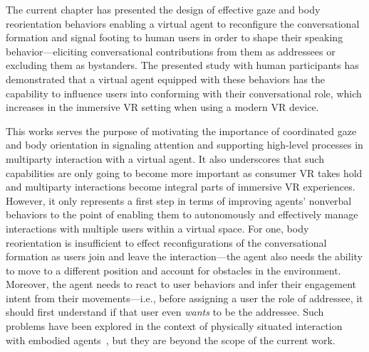The current chapter has presented the design of effective gaze and body reorientation behaviors enabling a virtual agent to reconfigure the conversational formation and signal footing to human users in order to shape their speaking behavior---eliciting conversational contributions from them as addressees or excluding them as bystanders. The presented study with human participants has demonstrated that a virtual agent equipped with these behaviors has the capability to influence users into conforming with their conversational role, which increases in the immersive VR setting when using a modern VR device.

This works serves the purpose of motivating the importance of coordinated gaze and body orientation in signaling attention and supporting high-level processes in multiparty interaction with a virtual agent. It also underscores that such capabilities are only going to become more important as consumer VR takes hold and multiparty interactions become integral parts of immersive VR experiences. However, it only represents a first step in terms of improving agents' nonverbal behaviors to the point of enabling them to autonomously and effectively manage interactions with multiple users within a virtual space. For one, body reorientation is insufficient to effect reconfigurations of the conversational formation as users join and leave the interaction---the agent also needs the ability to move to a different position and account for obstacles in the environment. Moreover, the agent needs to react to user behaviors and infer their engagement intent from their movements---i.e., before assigning a user the role of addressee, it should first understand if that user even \emph{wants} to be the addressee. Such problems have been explored in the context of physically situated interaction with embodied agents~\citep{bohus2009models}, but they are beyond the scope of the current work. 